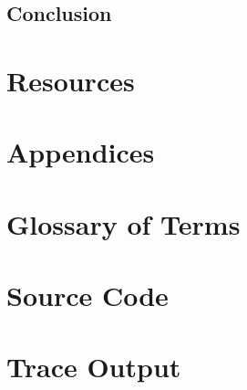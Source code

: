 \section{Conclusion}

\chapter{Resources}
\nocite{*}



\chapter{Appendices}
\appendix

\chapter{Glossary of Terms}\label{sec:glosterm}
\printglossaries

\newpage
\chapter{Source Code}\label{sec:srccode}

\newpage
\chapter{Trace Output}\label{sec:traceout}



